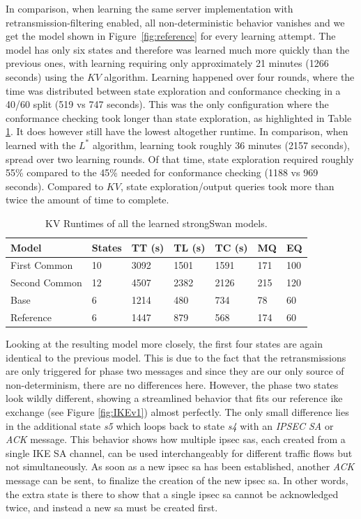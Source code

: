 In comparison, when learning the same server implementation with retransmission-filtering enabled, all non-deterministic behavior vanishes and we get the model shown in Figure~\ref{fig:reference} for every learning attempt. The model has only six states and therefore was learned much more quickly than the previous ones, with learning requiring only approximately 21 minutes (1266 seconds) using the $KV$ algorithm. Learning happened over four rounds, where the time was distributed between state exploration and conformance checking in a 40/60 split (519 vs 747 seconds). This was the only configuration where the conformance checking took longer than state exploration, as highlighted in Table \ref{tab:runtime_summary_kv}. It does however still have the lowest altogether runtime. In comparison, when learned with the $L^*$ algorithm, learning took roughly 36 minutes (2157 seconds), spread over two learning rounds. Of that time, state exploration required roughly 55\% compared to the 45\% needed for conformance checking (1188 vs 969 seconds). Compared to $KV$, state exploration/output queries took more than twice the amount of time to complete.

\begin{table}[h]
	\centering
	\begin{tabular}{|l|l|l|l|l|l|l|}
		\hline
		\rowcolor[HTML]{C0C0C0} 
		Model     		& States & TT (s)  & TL (s)  & TC (s)  & MQ  & EQ  \\ \hline
		First Common 	& 10     & 3092 & 1501 & 1591 & 171 & 100 \\ \hline
		Second Common  	& 12     & 4507 & 2382 & 2126 & 215 & 120 \\ \hline
		Base      		& 6      & 1214 & 480  & 734  & 78  & 60  \\ \hline
		Reference 		& 6      & 1447 & 879  & 568  & 174 & 60  \\ \hline
	\end{tabular}
	\caption{KV Runtimes of all the learned strongSwan models.}
	\label{tab:runtime_summary_kv}
\end{table}

Looking at the resulting model more closely, the first four states are again identical to the previous model. This is due to the fact that the retransmissions are only triggered for phase two messages and since they are our only source of non-determinism, there are no differences here. However, the phase two states look wildly different, showing a streamlined behavior that fits our reference \ac{ike} exchange (see Figure \ref{fig:IKEv1}) almost perfectly. The only small difference lies in the additional state \emph{s5} which loops back to state \emph{s4} with an \emph{IPSEC SA} or \emph{ACK} message. This behavior shows how multiple \ac{ipsec} \acp{sa}, each created from a single IKE SA channel, can be used interchangeably for different traffic flows but not simultaneously. As soon as a new \ac{ipsec} \ac{sa} has been established, another \emph{ACK} message can be sent, to finalize the creation of the new \ac{ipsec} \ac{sa}. In other words, the extra state is there to show that a single \ac{ipsec} \ac{sa} cannot be acknowledged twice, and instead a new \ac{sa} must be created first. 

